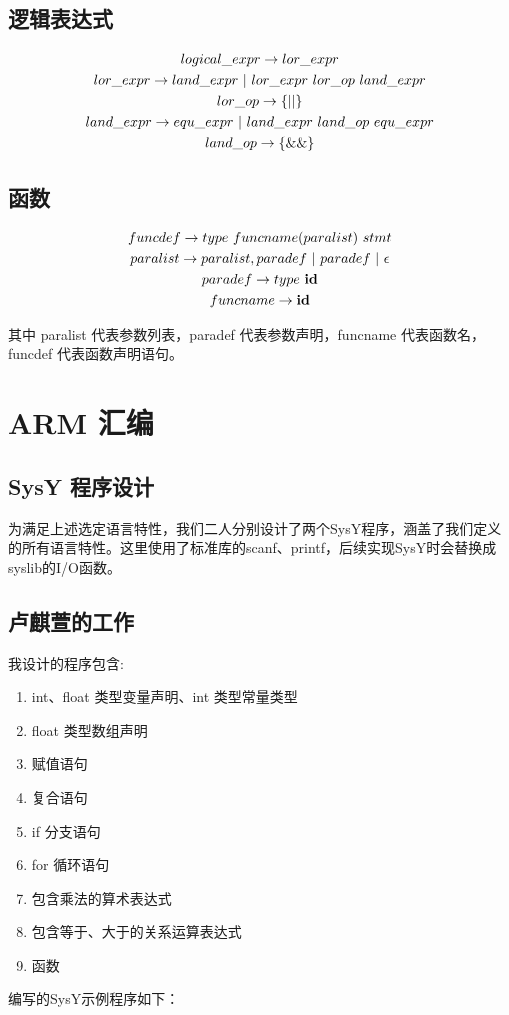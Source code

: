 \documentclass[UTF8,a4paper,10pt]{ctexart}
\begin{document}
\subsection{逻辑表达式}
\begin{gather*}
  logical\_expr\rightarrow lor\_expr\\
  lor\_expr\rightarrow land\_expr\ |\ lor\_expr\ lor\_op\ land\_expr\\
  lor\_op \rightarrow \rm\bf{\{||\}}\\
  land\_expr\rightarrow equ\_expr\ |\ land\_expr\ land\_op\ equ\_expr\\
  land\_op\rightarrow \rm\bf{\{\&\&\}}\\
\end{gather*}

\subsection{函数}
\begin{gather*}
  funcdef\rightarrow type\ funcname(paralist)\ stmt\\
  paralist\rightarrow paralist,paradef\ |\ paradef\ |\ \epsilon\\
  paradef\rightarrow type\ \rm\bf{id}\\
  funcname \rightarrow \rm\bf{id}
\end{gather*}

其中 paralist 代表参数列表，paradef 代表参数声明，funcname 代表函数名，funcdef 代表函数声明语句。

\section{ARM 汇编}
\subsection{SysY 程序设计}
为满足上述选定语言特性，我们二人分别设计了两个SysY程序，涵盖了我们定义的所有语言特性。这里使用了标准库的scanf、printf，后续实现SysY时会替换成syslib的I/O函数。

\subsection{卢麒萱的工作}
我设计的程序包含:
\begin{enumerate}
  \item int、float 类型变量声明、int 类型常量类型
  \item float 类型数组声明
  \item 赋值语句
  \item 复合语句
  \item if 分支语句
  \item for 循环语句
  \item 包含乘法的算术表达式
  \item 包含等于、大于的关系运算表达式
  \item 函数
\end{enumerate}
编写的SysY示例程序如下：
\end{document}
